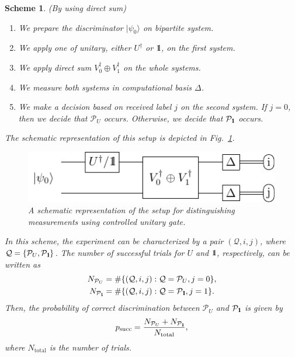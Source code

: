 \documentclass[preprint,12pt, a4paper]{elsarticle}
\newcommand{\ket}[1]{\ensuremath{|#1\rangle}}
\newcommand{\bra}[1]{\ensuremath{\langle#1|}}
\newcommand{\ketbra}[2]{\ensuremath{\ket{#1}\bra{#2}}}
\newcommand{\proj}[1]{\ensuremath{\ketbra{#1}{#1}}}
\newcommand{\1}{{\rm 1\hspace{-0.9mm}l}}
\newcommand{\Id}{{\rm 1\hspace{-0.9mm}l}}
\newcommand{\PP}{\mathcal{P}}
\newtheorem{scheme}{Scheme}
\begin{document}
\begin{scheme}(By using direct sum)



\begin{enumerate}
\item We prepare the discriminator $\ket{\psi_{0}}$ on bipartite
system.
\item We apply one of unitary,   either $U^\dagger$ or
$\Id$, on  the first system. 
\item We apply direct sum $V_0^\dagger \oplus V_1^\dagger$ on the whole systems. 
\item We measure both  systems in computational basis $\Delta$.
\item We make a decision based on received label $j$ on the second system. If $j=0$, then we
decide that $\PP_U$ occurs. Otherwise, we decide that $\PP_{\Id}$ occurs.
\end{enumerate}

The schematic representation of this setup is depicted in
Fig.~\ref{fig:controlled}.
\begin{figure}[h!]
	\centering
	\includegraphics[scale=1.5]{pics/controlled_unitary}

	\caption{ A schematic representation of the setup for distinguishing
		measurements using controlled unitary gate.
	}\label{fig:controlled}
\end{figure}

In this scheme, the experiment can be characterized by a pair $(\mathcal{Q}, i,j)$, where $\mathcal{Q} = \{ \PP_{U}, \PP_{\Id} \}$. The number of successful trials for $U$ and $\Id$, respectively, can be written  as 
\begin{eqnarray}
N_{\PP_U} &= \#\{(\mathcal{Q},  i, j): \mathcal{Q} = \PP_U, j = 0\}, \\
N_{\PP_\Id} &= \#\{(\mathcal{Q},  i, j): \mathcal{Q} = \PP_\Id, j = 1\}. 
\end{eqnarray}
Then, the probability of correct discrimination between $\PP_{U} $ and $\PP_\Id$ is given by
\begin{equation}
p_{\text{succ}} = \frac{N_{\PP_{U}} + N_{\PP_{\Id}}}{N_{\text{total}}},
\end{equation}
where $N_{\text{total}}$ is the number of trials. 
\end{scheme}
\end{document}
